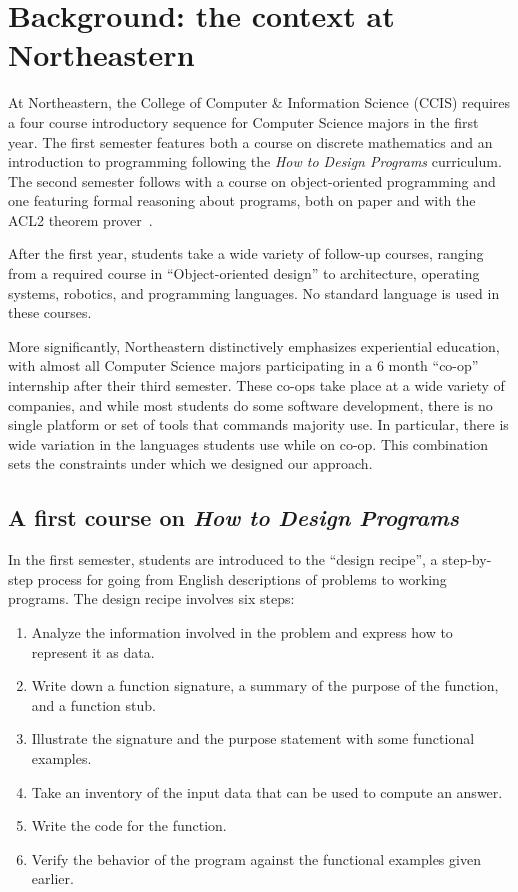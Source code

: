 \documentclass[submission,copyright]{eptcs}
\begin{document}
\section{Background: the context at Northeastern}
\label{sec:background}

At Northeastern, the College of Computer \& Information Science (CCIS)
requires a four course introductory sequence for Computer Science majors in the first year.  The
first semester features both a course on discrete mathematics and
 an introduction to programming following the \emph{How to Design
  Programs} curriculum.  The second semester follows with a course on
object-oriented programming and one featuring formal reasoning about
programs, both on paper and with the ACL2 theorem
prover~\cite{dvanhorn:Kaufmann2000ComputerAided}.

After the first year, students take a wide variety of
follow-up courses, ranging from a required course in ``Object-oriented
design'' to architecture, operating systems, robotics, and programming
languages.  No standard language is used in these courses.  

More significantly, Northeastern distinctively emphasizes experiential
education, with almost all Computer Science majors participating in a
6 month ``co-op'' internship after their third semester.  These co-ops
take place at a wide variety of companies, and while most students do
some software development, there is no single platform or
set of tools that commands majority use.
In particular, there is wide variation in the languages students use
while on co-op. This combination sets the constraints under which we
designed our approach.

\subsection{A first course on \emph{How to Design Programs}}

In the first semester, students are introduced to the ``design
recipe'', a step-by-step process for going from English descriptions
of problems to working programs.  The design recipe involves six steps:
\begin{enumerate}
\item Analyze the information involved in the problem and express
  how to represent it as data.
\item Write down a function signature, a summary of the purpose
  of the function, and a function stub.
\item Illustrate the signature and the purpose statement with some
  functional examples.
\item Take an inventory of the input data that can be used to compute
  an answer.
\item Write the code for the function.
\item Verify the behavior of the program against the functional
  examples given earlier.
\end{enumerate}
\end{document}
